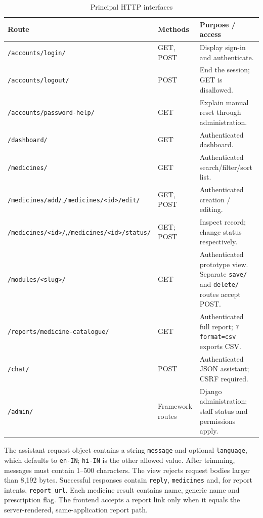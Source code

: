 \documentclass[11pt,a4paper]{article}
\begin{document}
\begin{table}[H]
\centering\small
\caption{Principal HTTP interfaces}
\begin{tabularx}{\textwidth}{L{53mm}L{24mm}Y}
\toprule Route & Methods & Purpose / access\\\midrule
\texttt{/accounts/login/} & GET, POST & Display sign-in and authenticate.\\
\texttt{/accounts/logout/} & POST & End the session; GET is disallowed.\\
\texttt{/accounts/password-help/} & GET & Explain manual reset through administration.\\
\texttt{/dashboard/} & GET & Authenticated dashboard.\\
\texttt{/medicines/} & GET & Authenticated search/filter/sort list.\\
\texttt{/medicines/add/},\newline\texttt{/medicines/<id>/edit/} & GET, POST & Authenticated creation / editing.\\
\texttt{/medicines/<id>/},\newline\texttt{/medicines/<id>/status/} & GET; POST & Inspect record; change status respectively.\\
\texttt{/modules/<slug>/} & GET & Authenticated prototype view. Separate \texttt{save/} and \texttt{delete/} routes accept POST.\\
\texttt{/reports/medicine-catalogue/} & GET & Authenticated full report; \texttt{?format=csv} exports CSV.\\
\texttt{/chat/} & POST & Authenticated JSON assistant; CSRF required.\\
\texttt{/admin/} & Framework routes & Django administration; staff status and permissions apply.\\
\bottomrule
\end{tabularx}
\end{table}

The assistant request object contains a string \texttt{message} and optional \texttt{language}, which defaults to \texttt{en-IN}; \texttt{hi-IN} is the other allowed value. After trimming, messages must contain 1--500 characters. The view rejects request bodies larger than 8,192 bytes. Successful responses contain \texttt{reply}, \texttt{medicines} and, for report intents, \texttt{report\_url}. Each medicine result contains name, generic name and prescription flag. The frontend accepts a report link only when it equals the server-rendered, same-application report path.
\end{document}

